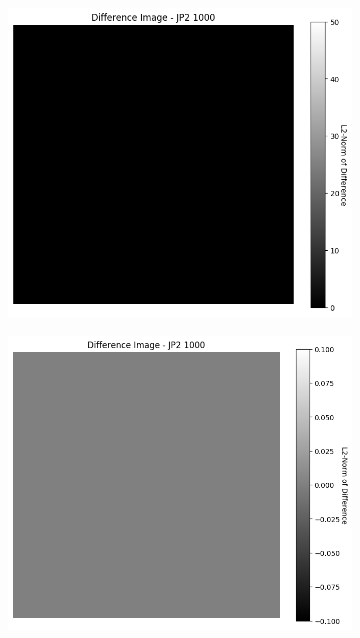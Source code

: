 \begin{figure}[htb]
\begin{subfigure}[b]{0.48\textwidth}
        \caption{}
        \label{fig:img_quality_comp_jp2_1000_center_histo}
    \end{subfigure}
    \\
    \begin{subfigure}[b]{0.48\textwidth}
        \centering
        \includegraphics[width=\textwidth]{doc/thesis/0_figures/compare_quality/set1/jp2_1000_center_diff_heatmap.png}
        \caption{}
        \label{fig:img_quality_comp_jp2_1000_center_diff}
    \end{subfigure}
    \begin{subfigure}[b]{0.48\textwidth}
        \centering
        \includegraphics[width=\textwidth]{doc/thesis/0_figures/compare_quality/set1/jp2_1000_center_diff_heatmap_rel.png}

\end{subfigure}
\end{figure}
